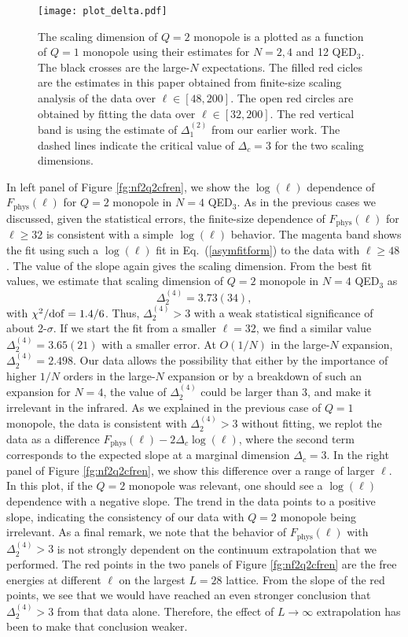 \documentclass[prd, onecolumn, superscriptaddress, nofootinbib, notitlepage, floatfix]{revtex4-1}
\newcommand\bef{\begin{figure*}}
\newcommand\eef[1]{\label{fg:#1}\end{figure*}}
\newcommand\beq{\begin{equation}}
\newcommand\eeq[1]{\label{#1}\end{equation}}
\newcommand\fgn[1]{Figure \ref{fg:#1}}
\newcommand\eqn[1]{Eq.\ (\ref{#1})}
\newcommand{\phys}{\mathrm{phys}}
\begin{document}
\bef
\centering
\texttt{[image: plot\_delta.pdf]}

\caption{ The scaling dimension of $Q=2$ monopole is a plotted as
a function of $Q=1$ monopole using their estimates for $N=2,4$ and
12 QED$_3$.  The black crosses are the large-$N$ expectations.  The
filled red cicles are the estimates in this paper obtained from
finite-size scaling analysis of the data over $\ell\in[48,200]$.
The open red circles are obtained by fitting the data over
$\ell\in[32,200]$.  The red vertical band is using the estimate of
$\Delta^{(2)}_1$ from our earlier work.  The dashed lines indicate
the critical value of $\Delta_c=3$ for the two scaling dimensions.
}

\eef{delta}


In left panel of \fgn{nf2q2cfren}, we show the $\log(\ell)$ dependence
of $F_\phys(\ell)$ for $Q=2$ monopole in $N=4$ QED$_3$. As in the
previous cases we discussed, given the statistical errors, the
finite-size dependence of $F_\phys(\ell)$ for $\ell\ge 32$ is
consistent with a simple $\log(\ell)$ behavior. The magenta band
shows the fit using such a $\log(\ell)$ fit in \eqn{asymfitform}
to the data with $\ell\ge48$.  The value of the slope again gives
the scaling dimension. From the best fit values, we estimate that
scaling dimension of $Q=2$ monopole in $N=4$ QED$_3$ as
\beq
\Delta_2^{(4)}=3.73(34),
\eeq{n4q2deltavals}
with $\chi^2/{\rm dof}=1.4/6$.  Thus, $\Delta_2^{(4)}>3$  with a
weak statistical significance of about 2-$\sigma$.  If we start the
fit from a smaller $\ell=32$, we find a similar value
$\Delta_2^{(4)}=3.65(21)$ with a smaller error.  At $O(1/N)$ in the
large-$N$ expansion, $\Delta_2^{(4)} = 2.498$. Our data allows the
possibility that either by the importance of higher $1/N$ orders
in the large-$N$ expansion or by a breakdown of such an expansion
for $N=4$, the value of $\Delta_2^{(4)}$ could be larger than 3,
and make it irrelevant in the infrared.  As we explained in the
previous case of $Q=1$ monopole, the data is consistent with
$\Delta_2^{(4)}>3$ without fitting, we replot the data as a difference
$F_\phys(\ell) - 2\Delta_c\log(\ell)$, where the second term
corresponds to the expected slope at a marginal dimension $\Delta_c=3$.
In the right panel of \fgn{nf2q2cfren}, we show this difference
over a range of larger $\ell$.  In this plot, if the $Q=2$ monopole
was relevant, one should see a $\log(\ell)$ dependence with a
negative slope. The trend in the data points to a positive slope,
indicating the consistency of our data with $Q=2$ monopole being
irrelevant.  As a final remark, we note that the behavior of
$F_\phys(\ell)$ with $\Delta_2^{(4)}>3$ is not strongly dependent
on the continuum extrapolation that we performed.  The red points
in the two panels of \fgn{nf2q2cfren} are the free energies at
different $\ell$ on the largest $L=28$ lattice.  From the slope of
the red points, we see that we would have reached an even stronger
conclusion that $\Delta_2^{(4)}>3$ from that data alone. Therefore,
the effect of $L\to\infty$ extrapolation has been to make that
conclusion weaker.
\end{document}

